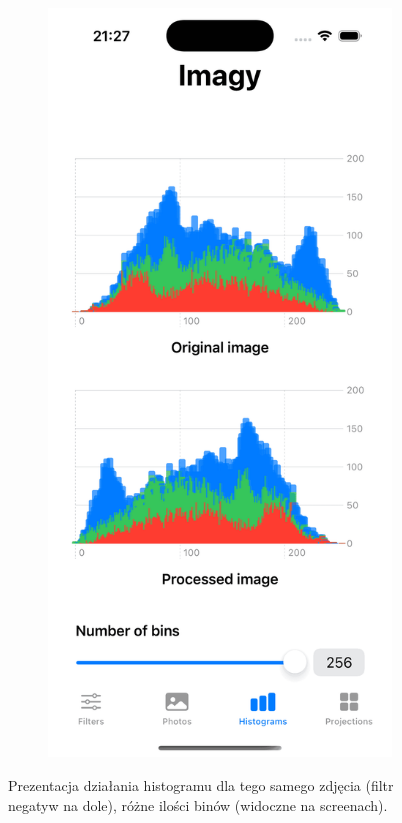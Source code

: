 \documentclass[a4paper]{article}
\begin{document}
\begin{figure}[H]
\begin{subfigure}{0.2\textwidth}
        \label{fig:histogram_95}
    \end{subfigure}
    \hfill
    \begin{subfigure}{0.2\textwidth}
        \centering
        \includegraphics[width=\linewidth]{images/histogram_256.png}
        \label{fig:histogram_256}
    \end{subfigure}
    \caption{Prezentacja działania histogramu dla tego samego zdjęcia (filtr negatyw na dole), różne ilości binów (widoczne na screenach).}
    \label{fig:histogram}
\end{figure}
\end{document}
